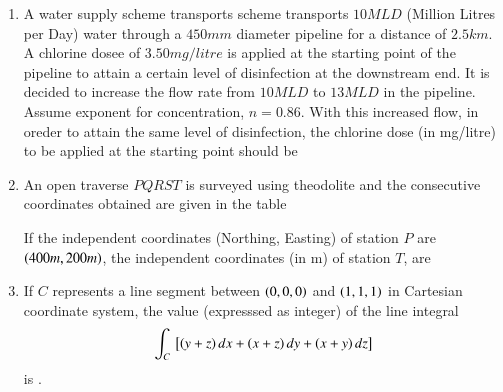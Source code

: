 \documentclass[journal,12pt,onecolumn]{IEEEtran}
\theoremstyle{remark}
\begin{document}
\begin{enumerate}
\item A water supply scheme transports scheme transports $10MLD$ (Million Litres per Day) water through a $450mm $ diameter pipeline for a distance of $2.5 km $. A chlorine dosee of $3.50 mg/litre$ is applied at the starting point of the pipeline to attain a certain level of disinfection at the downstream end. It is decided to increase the flow rate from $10 MLD$ to $13 MLD$ in the pipeline. Assume exponent for concentration, $n = 0.86 $.  With this increased flow, in oreder to attain the same level of disinfection, the chlorine dose (in mg/litre) to be applied at the starting point should be
\begin{enumerate}
\end{enumerate}

\item An open traverse $PQRST$ is surveyed using theodolite and the consecutive coordinates obtained are given in the table




If the independent coordinates (Northing, Easting) of station $P$ are $\left(400m, 200m\right)$,
the independent coordinates (in m) of station $T$, are
\begin{enumerate}
\end{enumerate}

\item If $C$ represents a line segment between $\left(0, 0, 0\right)$ and $\left(1, 1, 1\right)$ in Cartesian coordinate system, the value (expresssed as integer) of the line integral 
\begin{align}
\int_{C} {}\left[\left(y + z\right) dx + \left( x+ z\right) dy + \left(x + y\right) dz\right] 
\end{align}
is \underline{\hspace{2cm}}.

\end{enumerate}
\end{document}
